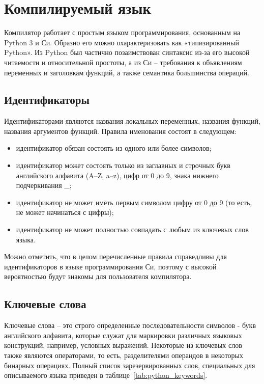 \newpage
\section{Компилируемый язык}
\label{sec:language}

Компилятор работает с простым языком программирования, основанным на Python 3 и Си.
Образно его можно охарактеризовать как «типизированный Python».
Из Python был частично позаимствован синтаксис из-за его высокой читаемости и относительной простоты, а из Си -- требования к объявлениям переменных и заголовкам функций, а также семантика большинства операций.

\subsection{Идентификаторы}

Идентификаторами являются названия локальных переменных, названия функций, названия аргументов функций.
Правила именования состоят в следующем:

\begin{itemize}
    \item идентификатор обязан состоять из одного или более символов;
    \item идентификатор может состоять только из заглавных и строчных букв английского алфавита (A--Z, a--z), цифр от 0 до 9, знака нижнего подчеркивания \_;
    \item идентификатор не может иметь первым символом цифру от 0 до 9 (то есть, не может начинаться с цифры);
    \item идентификатор не может полностью совпадать с любым из ключевых слов языка.

\end{itemize}

Можно отметить, что в целом перечисленные правила справедливы для идентификаторов в языке программирования Си, поэтому с высокой вероятностью будут знакомы для пользователя компилятора.

\subsection{Ключевые слова}

Ключевые слова -- это строго определенные последовательности символов - букв английского алфавита, которые служат для маркировки различных языковых конструкций, например, условных выражений.
Некоторые из ключевых слов также являются операторами, то есть, разделителями операндов в некоторых бинарных операциях.
Полный список зарезервированных слов, специальных для описываемого языка приведен в таблице~\ref{tab:python_keywords}.

